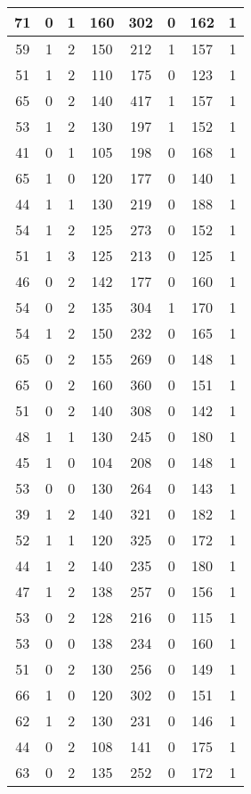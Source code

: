 \documentclass{article}
\begin{document}
\begin{longtable}{|c|c|c|c|c|c|c|c|}
71 & 0 & 1 & 160 & 302 & 0 & 162 & 1 \\ \hline
59 & 1 & 2 & 150 & 212 & 1 & 157 & 1 \\ \hline
51 & 1 & 2 & 110 & 175 & 0 & 123 & 1 \\ \hline
65 & 0 & 2 & 140 & 417 & 1 & 157 & 1 \\ \hline
53 & 1 & 2 & 130 & 197 & 1 & 152 & 1 \\ \hline
41 & 0 & 1 & 105 & 198 & 0 & 168 & 1 \\ \hline
65 & 1 & 0 & 120 & 177 & 0 & 140 & 1 \\ \hline
44 & 1 & 1 & 130 & 219 & 0 & 188 & 1 \\ \hline
54 & 1 & 2 & 125 & 273 & 0 & 152 & 1 \\ \hline
51 & 1 & 3 & 125 & 213 & 0 & 125 & 1 \\ \hline
46 & 0 & 2 & 142 & 177 & 0 & 160 & 1 \\ \hline
54 & 0 & 2 & 135 & 304 & 1 & 170 & 1 \\ \hline
54 & 1 & 2 & 150 & 232 & 0 & 165 & 1 \\ \hline
65 & 0 & 2 & 155 & 269 & 0 & 148 & 1 \\ \hline
65 & 0 & 2 & 160 & 360 & 0 & 151 & 1 \\ \hline
51 & 0 & 2 & 140 & 308 & 0 & 142 & 1 \\ \hline
48 & 1 & 1 & 130 & 245 & 0 & 180 & 1 \\ \hline
45 & 1 & 0 & 104 & 208 & 0 & 148 & 1 \\ \hline
53 & 0 & 0 & 130 & 264 & 0 & 143 & 1 \\ \hline
39 & 1 & 2 & 140 & 321 & 0 & 182 & 1 \\ \hline
52 & 1 & 1 & 120 & 325 & 0 & 172 & 1 \\ \hline
44 & 1 & 2 & 140 & 235 & 0 & 180 & 1 \\ \hline
47 & 1 & 2 & 138 & 257 & 0 & 156 & 1 \\ \hline
53 & 0 & 2 & 128 & 216 & 0 & 115 & 1 \\ \hline
53 & 0 & 0 & 138 & 234 & 0 & 160 & 1 \\ \hline
51 & 0 & 2 & 130 & 256 & 0 & 149 & 1 \\ \hline
66 & 1 & 0 & 120 & 302 & 0 & 151 & 1 \\ \hline
62 & 1 & 2 & 130 & 231 & 0 & 146 & 1 \\ \hline
44 & 0 & 2 & 108 & 141 & 0 & 175 & 1 \\ \hline
63 & 0 & 2 & 135 & 252 & 0 & 172 & 1 \\ \hline

\end{longtable}
\end{document}
